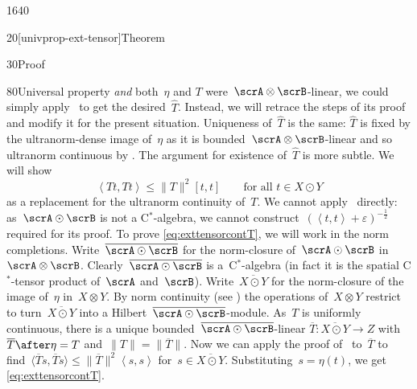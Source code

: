 \begin{parsec}{1640}
\begin{point}{20}[univprop-ext-tensor]{Theorem}
\begin{point}{30}{Proof}
\begin{point}{80}{Universal property}
    \emph{and} both~$\eta$ and $T$ were~$\scrA \otimes \scrB$-linear,
    we could simply apply~
    to get the desired~$\hat{T}$.
Instead, we will retrace the steps of its proof
    and modify it for the present situation.
Uniqueness of~$\hat{T}$ is the same:
    $\hat{T}$ is fixed by the ultranorm-dense image of~$\eta$
    as it is bounded~$\scrA\otimes\scrB$-linear
    and so ultranorm continuous by .
The argument for existence of~$\hat{T}$ is more subtle.
We will show
\begin{equation}\label{eq:exttensorcontT}
    \left<T t, T t\right> \leq \|T\|^2 [t,t]
        \qquad \text{for all~$t \in X \odot Y$}
\end{equation}
as a replacement for the ultranorm continuity of~$T$.
We cannot apply~ directly:
    as~$\scrA \odot \scrB$ is not a C$^*$-algebra,
    we cannot construct~$(\left<t,t\right>+\varepsilon)^{-\frac{1}{2}}$
    required for its proof.
To prove \eqref{eq:exttensorcontT}, we will work in the norm completions.
Write~$\overline{\scrA \odot \scrB}$
    for the norm-closure of~$\scrA \odot \scrB$ in~$\scrA \otimes \scrB$.
Clearly~$\overline{\scrA \odot \scrB}$
    is a~C$^*$-algebra
    (in fact it is the spatial C$^*$-tensor product of~$\scrA$ and~$\scrB$).
Write~$\overline{X \odot Y}$
    for the norm-closure of the image of~$\eta$ in~$X \otimes Y$.
By norm continuity
    (see )
    the operations of~$X \otimes Y$
    restrict to turn~$\overline{X \odot Y}$ into a
    Hilbert~$\overline{\scrA \odot \scrB}$-module.
As~$T$ is uniformly continuous,
    there is a unique bounded~$\overline{\scrA\odot\scrB}$-linear
    $\overline{T}\colon \overline{X\odot Y} \to Z$
    with~$\overline{T} \after \eta = T$ and~$\|T\| = \|\overline{T}\|$.
Now we can apply the proof of~
    to~$\overline{T}$
    to find~$\langle \overline{T}s,\overline{T}s\rangle \leq
    \|\overline{T}\|^2\left<s,s\right>$
    for~$s \in \overline{X \odot Y}$.
Substituting~$s = \eta(t)$,
    we get \eqref{eq:exttensorcontT}.


\end{point}
\end{point}
\end{point}
\end{parsec}
